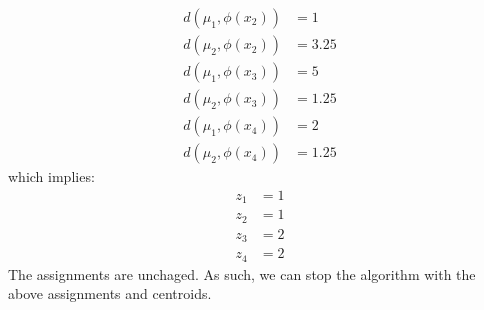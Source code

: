 \documentclass[12pt]{article}
\begin{document}
\begin{enumerate}[label=(\alph*)]
\begin{enumerate}
\begin{enumerate}
\begin{align*}
          d(\mu_1, \phi(x_2)) &= 1 \\
          d(\mu_2, \phi(x_2)) &= 3.25 \\
          d(\mu_1, \phi(x_3)) &= 5 \\
          d(\mu_2, \phi(x_3)) &= 1.25 \\
          d(\mu_1, \phi(x_4)) &= 2 \\
          d(\mu_2, \phi(x_4)) &= 1.25
        \end{align*}
        which implies:
        \begin{align*}
          z_1 &= 1 \\
          z_2 &= 1 \\
          z_3 &= 2 \\
          z_4 &= 2
        \end{align*}
         The assignments are unchaged. As such, we can stop the algorithm with the above assignments and centroids.
      \end{enumerate}
    \end{enumerate}
  \end{enumerate}
\end{document}

